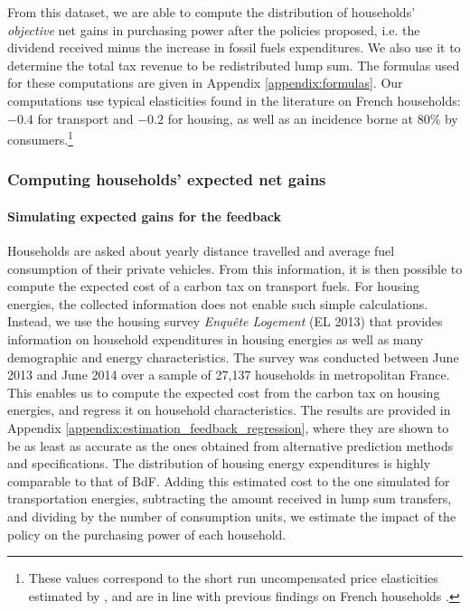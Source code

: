 \documentclass[11pt]{article}
\begin{document}
From this dataset, we are able to compute the distribution of households' \textit{objective} net gains in purchasing power after the policies proposed, i.e. the dividend received minus the increase in fossil fuels expenditures. We also use it to determine the total tax revenue to be redistributed lump sum. The formulas used for these computations are given in Appendix \ref{appendix:formulas}. Our computations use typical elasticities found in the literature on French households: $-0.4$ for transport and $-0.2$ for housing, as well as an incidence borne at 80\% by consumers.\footnote{These values correspond to the short run uncompensated price elasticities estimated by \citet{douenne_vertical_2018}, and are in line with previous findings on French households \citep[e.g.][]{clerc_marcus,bureau_distributional_2011}.} 
    \subsubsection{Computing households' expected net gains\label{subsubsec:computation_feedback}}

\paragraph{Simulating expected gains for the feedback}
Households are asked about yearly distance travelled and average fuel consumption of their private vehicles. From this information, it is then possible to compute the expected cost of a carbon tax on transport fuels. For housing energies, the collected information does not enable such simple calculations. Instead, we use the housing survey \emph{Enquête Logement} (EL 2013) that provides information on household expenditures in housing energies as well as many demographic and energy characteristics. The survey was conducted between June 2013 and June 2014 over a sample of 27,137 households in metropolitan France. This enables us to compute the expected cost from the carbon tax on housing energies, and regress it on household characteristics. The results are provided in Appendix \ref{appendix:estimation_feedback_regression}, where they are shown to be as least as accurate as the ones obtained from alternative prediction methods and specifications. The distribution of housing energy expenditures is highly comparable to that of BdF. Adding this estimated cost to the one simulated for transportation energies, subtracting the amount received in lump sum transfers, and dividing by the number of consumption units, we estimate the impact of the policy on the purchasing power of each household.
\end{document}
